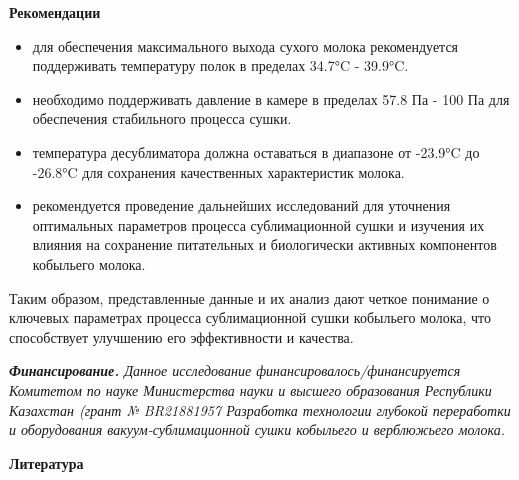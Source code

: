 \begin{multicols}{2}
{\bfseries Рекомендации}

\begin{itemize}
\item
  для обеспечения максимального выхода сухого молока рекомендуется
  поддерживать температуру полок в пределах 34.7°C - 39.9°C.
\item
  необходимо поддерживать давление в камере в пределах 57.8 Па - 100 Па
  для обеспечения стабильного процесса сушки.
\item
  температура десублиматора должна оставаться в диапазоне от -23.9°C до
  -26.8°C для сохранения качественных характеристик молока.
\item
  рекомендуется проведение дальнейших исследований для уточнения
  оптимальных параметров процесса сублимационной сушки и изучения их
  влияния на сохранение питательных и биологически активных компонентов
  кобыльего молока.
\end{itemize}

Таким образом, представленные данные и их анализ дают четкое понимание о
ключевых параметрах процесса сублимационной сушки кобыльего молока, что
способствует улучшению его эффективности и качества.

\emph{{\bfseries Финансирование.} Данное исследование
финансировалось/финансируется Комитетом по науке Министерства науки и
высшего образования Республики Казахстан (грант № BR21881957 Разработка
технологии глубокой переработки и оборудования вакуум-сублимационной
сушки кобыльего и верблюжьего молока.}

\end{multicols}

\begin{center}
  {\bfseries Литература}
  \end{center}


